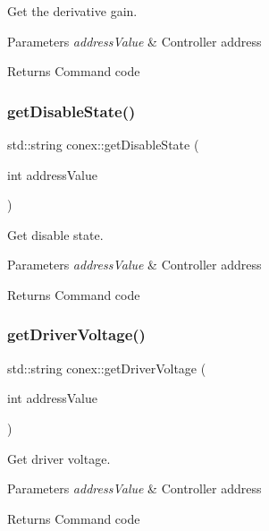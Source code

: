 Get the derivative gain. 


\begin{DoxyParams}{Parameters}
{\em address\+Value} & Controller address \\
\hline
\end{DoxyParams}
\begin{DoxyReturn}{Returns}
Command code 
\end{DoxyReturn}
\mbox{\label{namespaceconex_aa030f5f6f8e7d9de0c53bc783fd3b40a}} 
\subsubsection{\texorpdfstring{get\+Disable\+State()}{getDisableState()}}
{\footnotesize\ttfamily std\+::string conex\+::get\+Disable\+State (\begin{DoxyParamCaption}\item[{int}]{address\+Value }\end{DoxyParamCaption})}



Get disable state. 


\begin{DoxyParams}{Parameters}
{\em address\+Value} & Controller address \\
\hline
\end{DoxyParams}
\begin{DoxyReturn}{Returns}
Command code 
\end{DoxyReturn}
\mbox{\label{namespaceconex_a0588a5e5f42da8cb5041900bbfba4243}} 
\subsubsection{\texorpdfstring{get\+Driver\+Voltage()}{getDriverVoltage()}}
{\footnotesize\ttfamily std\+::string conex\+::get\+Driver\+Voltage (\begin{DoxyParamCaption}\item[{int}]{address\+Value }\end{DoxyParamCaption})}



Get driver voltage. 


\begin{DoxyParams}{Parameters}
{\em address\+Value} & Controller address \\
\hline
\end{DoxyParams}
\begin{DoxyReturn}{Returns}
Command code 
\end{DoxyReturn}
\mbox{\label{namespaceconex_a8614267e3ba2e2c44b44bcd30bbb84b0}} 
